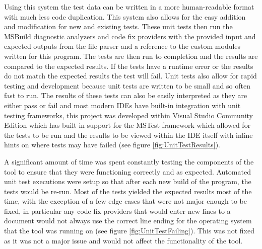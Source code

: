 Using this system the test data can be written in a more human-readable format with much less code duplication. This system also allows for the easy addition and modification for new and existing tests. These unit tests then run the MSBuild diagnostic analyzers and code fix providers with the provided input and expected outputs from the file parser and a reference to the custom modules written for this program. The tests are then run to completion and the results are compared to the expected results. If the tests have a runtime error or the results do not match the expected results the test will fail.
Unit tests also allow for rapid testing and development because unit tests are written to be small and so often fast to run. The results of these tests can also be easily interpreted as they are either pass or fail and most modern IDEs have built-in integration with unit testing frameworks, this project was developed within Visual Studio Community Edition which has built-in support for the MSTest framework which allowed for the tests to be run and the results to be viewed within the IDE itself with inline hints on where tests may have failed (see figure \ref{fig:UnitTestResults}).

A significant amount of time was spent constantly testing the components of the tool to ensure that they were functioning correctly and as expected. Automated unit test executions were setup so that after each new build of the program, the tests would be re-run. Most of the tests yielded the expected results most of the time, with the exception of a few edge cases that were not major enough to be fixed, in particular any code fix providers that would enter new lines to a document would not always use the correct line ending for the operating system that the tool was running on (see figure \ref{fig:UnitTestFailing}). This was not fixed as it was not a major issue and would not affect the functionality of the tool.

